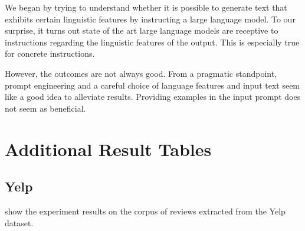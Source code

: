 \documentclass[11pt]{article}
\begin{document}
We began by trying to understand whether it is possible to generate text that
exhibits certain linguistic features by instructing a large language model.
To our surprise, it turns out state of the art large language models are
receptive to instructions regarding the linguistic features of the output.
This is especially true for concrete instructions.

However, the outcomes are not always good.
From a pragmatic standpoint, prompt engineering and a careful choice of language
features and input text seem like a good idea to alleviate results.
Providing examples in the input prompt does not seem as beneficial.

\newpage



\newpage

\appendix

\section{Additional Result Tables}\label{sec:yelp-tables}
\subsection{Yelp}
 show the
experiment results on the corpus of reviews extracted from the Yelp dataset.
\end{document}
